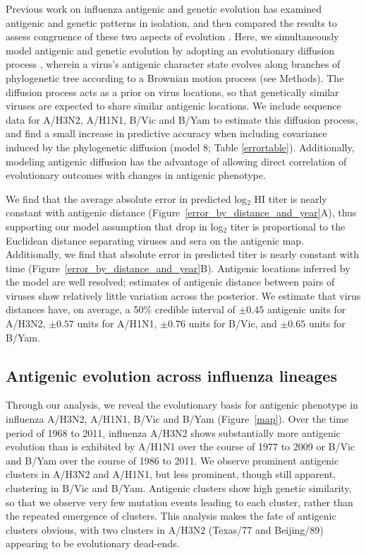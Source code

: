 \documentclass[11pt,oneside,letterpaper]{article}
\begin{document}
Previous work on influenza antigenic and genetic evolution has examined antigenic and genetic patterns in isolation, and then compared the results to assess congruence of these two aspects of evolution \cite{Hay01,Smith04,Russell08}. 
Here, we simultaneously model antigenic and genetic evolution by adopting an evolutionary diffusion process \cite{Lemey10}, wherein a virus's antigenic character state evolves along branches of phylogenetic tree according to a Brownian motion process (see Methods).
The diffusion process acts as a prior on virus locations, so that genetically similar viruses are expected to share similar antigenic locations.
We include sequence data for A/H3N2, A/H1N1, B/Vic and B/Yam to estimate this diffusion process, and find a small increase in predictive accuracy when including covariance induced by the phylogenetic diffusion (model 8; Table \ref{errortable}).
Additionally, modeling antigenic diffusion has the advantage of allowing direct correlation of evolutionary outcomes with changes in antigenic phenotype.

We find that the average absolute error in predicted log$_2$ HI titer is nearly constant with antigenic distance (Figure~\ref{error_by_distance_and_year}A), thus supporting our model assumption that drop in log$_2$ titer is proportional to the Euclidean distance separating viruses and sera on the antigenic map.
Additionally, we find that absolute error in predicted titer is nearly constant with time (Figure~\ref{error_by_distance_and_year}B).
Antigenic locations inferred by the model are well resolved; estimates of antigenic distance between pairs of viruses show relatively little variation across the posterior.
We estimate that virus distances have, on average, a 50\% credible interval of $\pm0.45$ antigenic units for A/H3N2, $\pm0.57$ units for A/H1N1, $\pm0.76$ units for B/Vic, and $\pm0.65$ units for B/Yam.

\subsection*{Antigenic evolution across influenza lineages}

Through our analysis, we reveal the evolutionary basis for antigenic phenotype in influenza A/H3N2, A/H1N1, B/Vic and B/Yam (Figure~\ref{map}).
Over the time period of 1968 to 2011, influenza A/H3N2 shows substantially more antigenic evolution than is exhibited by A/H1N1 over the course of 1977 to 2009 or B/Vic and B/Yam over the course of 1986 to 2011.
We observe prominent antigenic clusters in A/H3N2 and A/H1N1, but less prominent, though still apparent, clustering in B/Vic and B/Yam.
Antigenic clusters show high genetic similarity, so that we observe very few mutation events leading to each cluster, rather than the repeated emergence of clusters.
This analysis makes the fate of antigenic clusters obvious, with two clusters in A/H3N2 (Texas/77 and Beijing/89) appearing to be evolutionary dead-ends.
\end{document}
